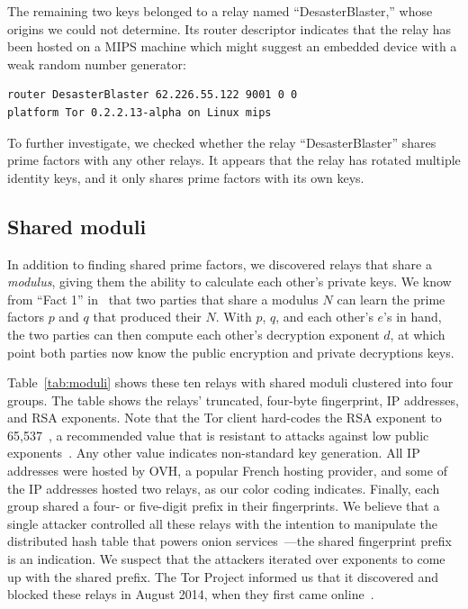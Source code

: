 The remaining two keys belonged to a relay named ``DesasterBlaster,'' whose
origins we could not determine. Its router descriptor indicates that the relay
has been hosted on a MIPS machine which might suggest an embedded device with a
weak random number generator:

\begin{verbatim}
router DesasterBlaster 62.226.55.122 9001 0 0
platform Tor 0.2.2.13-alpha on Linux mips
\end{verbatim}

To further investigate, we checked whether the relay ``DesasterBlaster'' shares
prime factors with any other relays. It appears that the relay has rotated
multiple identity keys, and it only shares prime factors with its own keys.


\subsection{Shared moduli}
\label{sec:shared-moduli}
In addition to finding shared prime factors, we discovered relays that share a
\emph{modulus}, giving them the ability to calculate each other's private keys.
We know from ``Fact 1'' in~\cite[\S~1.1]{Boneh1999a} that two parties that share
a modulus $N$ can learn the prime factors $p$ and $q$ that produced their $N$.
With $p$, $q$, and each other's $e$'s in hand, the two parties can then compute
each other's decryption exponent $d$, at which point both parties now know the
public encryption and private decryptions keys. 

Table~\ref{tab:moduli} shows these ten relays with shared moduli clustered into
four groups. The table shows the relays' truncated, four-byte fingerprint, IP
addresses, and RSA exponents.  Note that the Tor client hard-codes the RSA
exponent to 65,537~\cite[\S~0.3]{torspec}, a recommended value that is resistant
to attacks against low public exponents~\cite[\S~4]{Boneh1999a}.  Any other
value indicates non-standard key generation.  All IP addresses were hosted by
OVH, a popular French hosting provider, and some of the IP addresses hosted two
relays, as our color coding indicates.  Finally, each group shared a four- or
five-digit prefix in their fingerprints.  We believe that a single attacker
controlled all these relays with the intention to manipulate the distributed
hash table that powers onion services~\cite{Biryukov2013a}---the shared
fingerprint prefix is an indication.  We suspect that the attackers iterated
over exponents to come up with the shared prefix.  The Tor Project informed us
that it discovered and blocked these relays in August 2014, when they first came
online~\cite{tor-priv1}.

